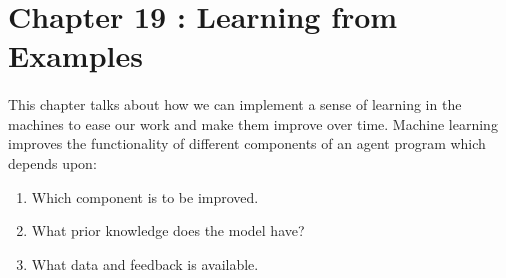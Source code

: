 \documentclass{article}
\begin{document}
















\section*{Chapter 19 : Learning from Examples}
  \paragraph{}
    This chapter talks about how we can implement a sense of learning in the machines to ease our work and make them improve over time. Machine learning improves the functionality of different components of an agent program which depends upon:
    \begin{enumerate}
      \item Which component is to be improved.
      \item What prior knowledge does the model have?
      \item What data and feedback is available.
    \end{enumerate}
    
\end{document}
